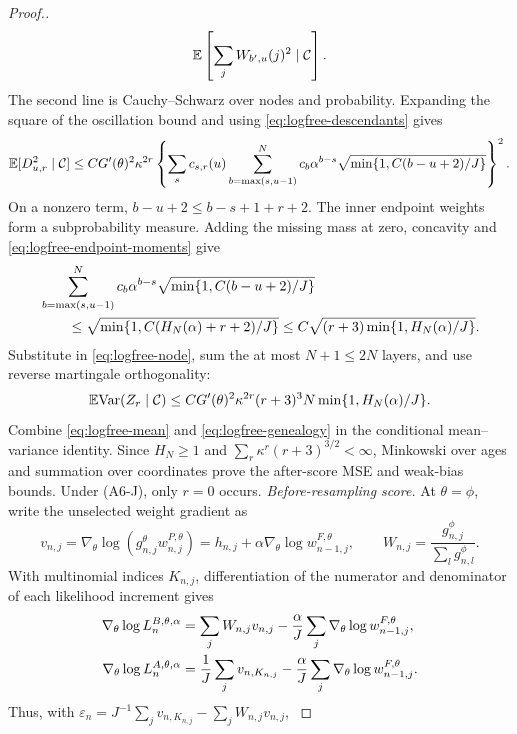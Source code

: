 \documentclass[11pt]{article}
\theoremstyle{thmstylethree}%
\begin{document}
\begin{proof}[Proof.]
{\begin{align*}
       \mathbb{E}\left[\sum_jW_{b',u}(j)^2\mid\mathcal C\right].
\end{align*}
The second line is Cauchy--Schwarz over nodes and probability.
Expanding the square of the oscillation bound and using
\eqref{eq:logfree-descendants} gives
\begin{align}
\mathbb{E}[D_{u,r}^2\mid\mathcal C]
\leq CG'(\theta)^2\kappa^{2r}
\left\{\sum_s c_{s,r}(u)
 \sum_{b=\max(s,u-1)}^N c_b\alpha^{b-s}
       \sqrt{\min\{1,C(b-u+2)/J\}}\right\}^2.
\label{eq:logfree-node}
\end{align}
On a nonzero term, $b-u+2\leq b-s+1+r+2$.
The inner endpoint weights form a subprobability measure. Adding the
missing mass at zero, concavity and \eqref{eq:logfree-endpoint-moments} give
\begin{align}
&\sum_{b=\max(s,u-1)}^N c_b\alpha^{b-s}
       \sqrt{\min\{1,C(b-u+2)/J\}}\notag\\
&\qquad\leq\sqrt{\min\{1,C(H_N(\alpha)+r+2)/J\}}
\leq C\sqrt{(r+3)\min\{1,H_N(\alpha)/J\}}.
\end{align}
Substitute in \eqref{eq:logfree-node}, sum the at most $N+1\leq2N$ layers,
and use reverse martingale orthogonality:
\begin{equation}
\mathbb{E}\mathrm{Var}(Z_r\mid\mathcal C)
\leq CG'(\theta)^2\kappa^{2r}(r+3)^3
       N\min\{1,H_N(\alpha)/J\}.
\label{eq:logfree-genealogy}
\end{equation}
Combine \eqref{eq:logfree-mean} and \eqref{eq:logfree-genealogy} in the
conditional mean--variance identity. Since $H_N\geq1$ and
$\sum_r\kappa^r(r+3)^{3/2}<\infty$, Minkowski over ages and summation
over coordinates prove the after-score MSE and weak-bias bounds.
Under (A6-J), only $r=0$ occurs.
\endgraf
\emph{Before-resampling score.}
At $\theta=\phi$, write the unselected weight gradient as
\[
v_{n,j}=\nabla_\theta\log(g_{n,j}^\theta w_{n,j}^{P,\theta})
=h_{n,j}+\alpha\nabla_\theta\log w_{n-1,j}^{F,\theta},\qquad
W_{n,j}=\frac{g_{n,j}^\phi}{\sum_lg_{n,l}^\phi}.
\]
With multinomial indices $K_{n,j}$, differentiation of the numerator
and denominator of each likelihood increment gives
\begin{align}
\nabla_\theta\log L_n^{B,\theta,\alpha}
&=\sum_jW_{n,j}v_{n,j}
 -\frac{\alpha}{J}\sum_j\nabla_\theta\log w_{n-1,j}^{F,\theta},\notag\\
\nabla_\theta\log L_n^{A,\theta,\alpha}
&=\frac1J\sum_jv_{n,K_{n,j}}
 -\frac{\alpha}{J}\sum_j\nabla_\theta\log w_{n-1,j}^{F,\theta}.
\end{align}
Thus, with $\varepsilon_n=J^{-1}\sum_jv_{n,K_{n,j}}
-\sum_jW_{n,j}v_{n,j}$,
}
\end{proof}
\end{document}
